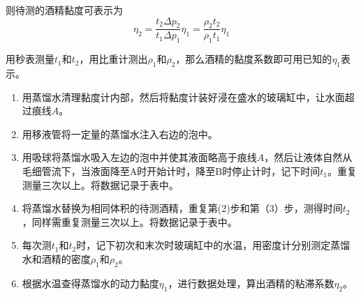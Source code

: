 \documentclass[UTF-8, a4paper, 12pt]{ctexart}
\begin{document}
    则待测的酒精黏度可表示为$$\eta_2 = \frac{t_2\Delta p_2}{t_1\Delta p_1}\eta_1 = \frac{\rho_2 t_2}{\rho_1 t_1}\eta_1$$

    用秒表测量$t_1$和$t_2$，用比重计测出$\rho_1$和$\rho_2$，那么酒精的黏度系数即可用已知的$\eta_1$表示。

    \textbf{ }

    \songti

    \begin{enumerate}[（1）]
        \item 用蒸馏水清理黏度计内部，然后将黏度计装好浸在盛水的玻璃缸中，让水面超过痕线$A$。
        \item 用移液管将一定量的蒸馏水注入右边的泡中。
        \item 用吸球将蒸馏水吸入左边的泡中并使其液面略高于痕线$A$，然后让液体自然从毛细管流下，当液面降至A时开始计时，降至B时停止计时，记下时间$t_1$。重复测量三次以上。将数据记录于表中。
        \item 将蒸馏水替换为相同体积的待测酒精，重复第(2)步和第（3）步，测得时间$t_2$，同样需重复测量三次以上。将数据记录于表中。
        \item 每次测$t_1$和$t_2$时，记下初次和末次时玻璃缸中的水温，用密度计分别测定蒸馏水和酒精的密度$\rho_1$和$\rho_2$。
        \item 根据水温查得蒸馏水的动力黏度$\eta_1$，进行数据处理，算出酒精的粘滞系数$\eta_2$。
    \end{enumerate}
\end{document}
